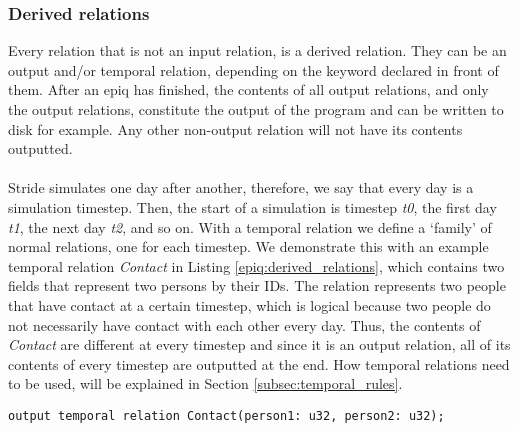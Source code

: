 \subsubsection{Derived relations}
Every relation that is not an input relation, is a derived relation. They can be an output and/or temporal relation, depending on the keyword declared in front of them. After an epiq has finished, the contents of all output relations, and only the output relations, constitute the output of the program and can be written to disk for example. Any other non-output relation will not have its contents outputted.
\\\\
Stride simulates one day after another, therefore, we say that every day is a simulation timestep. Then, the start of a simulation is timestep \textit{t0}, the first day \textit{t1}, the next day \textit{t2}, and so on. With a temporal relation we define a `family' of normal relations, one for each timestep. We demonstrate this with an example temporal relation \textit{Contact} in Listing \ref{epiq:derived_relations}, which contains two fields that represent two persons by their IDs. The relation represents two people that have contact at a certain timestep, which is logical because two people do not necessarily have contact with each other every day. Thus, the contents of \textit{Contact} are different at every timestep and since it is an output relation, all of its contents of every timestep are outputted at the end. How temporal relations need to be used, will be explained in Section \ref{subsec:temporal_rules}.

\begin{lstlisting}[caption={Derived relation declaration.}, captionpos=b, label={epiq:derived_relations}]
output temporal relation Contact(person1: u32, person2: u32);
\end{lstlisting}

